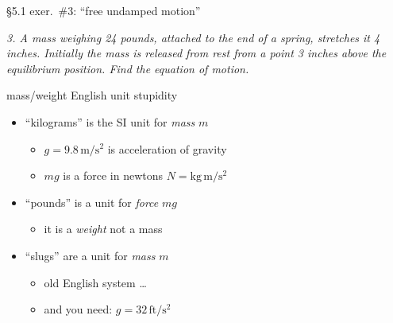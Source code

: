 \documentclass[dvipsnames,colorlinks]{beamer}
\begin{document}
\begin{frame}{\S5.1 exer.~\#3: ``free undamped motion''}

\noindent \emph{3. A mass weighing 24 pounds, attached to the end of a spring, stretches it 4 inches.  Initially the mass is released from rest from a point 3 inches above the equilibrium position.  Find the equation of motion.}

\vspace{55mm}
\end{frame}


\begin{frame}{mass/weight English unit stupidity}

\begin{itemize}
\item ``kilograms'' is the SI unit for \emph{mass} $m$
    \begin{itemize}
    \item $g=9.8 \,\text{m}/\text{s}^2$ is acceleration of gravity
    \item $mg$ is a force in newtons $N = \text{kg}\,\text{m}/\text{s}^2$
    \end{itemize}
\item ``pounds'' is a unit for \emph{force} $mg$
    \begin{itemize}
    \item it is a \emph{weight} not a mass
    \end{itemize}
\item ``slugs'' are a unit for \emph{mass} $m$
    \begin{itemize}
    \item old English system \dots
    \item and you need: $g=32 \,\text{ft}/\text{s}^2$
    \end{itemize}
\end{itemize}
\end{frame}
\end{document}
